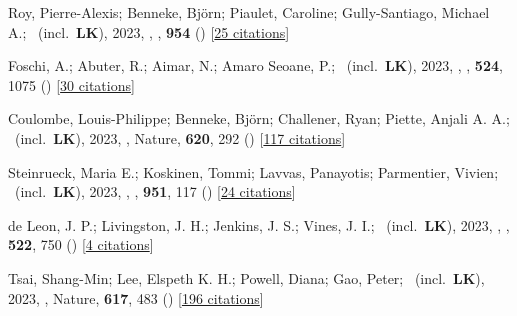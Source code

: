 \item[{\color{numcolor}\scriptsize93}] Roy, Pierre-Alexis; Benneke, Bj{\"o}rn; Piaulet, Caroline; Gully-Santiago, Michael A.; \etal\ (incl.\ \textbf{LK}), 2023, , \apj, \textbf{954} () [\href{https://ui.adsabs.harvard.edu/abs/2023ApJ...954L..52R}{25 citations}]

\item[{\color{numcolor}\scriptsize92}] Foschi, A.; Abuter, R.; Aimar, N.; Amaro Seoane, P.; \etal\ (incl.\ \textbf{LK}), 2023, , \mnras, \textbf{524}, 1075 () [\href{https://ui.adsabs.harvard.edu/abs/2023MNRAS.524.1075F}{30 citations}]

\item[{\color{numcolor}\scriptsize91}] Coulombe, Louis-Philippe; Benneke, Bj{\"o}rn; Challener, Ryan; Piette, Anjali A. A.; \etal\ (incl.\ \textbf{LK}), 2023, , Nature, \textbf{620}, 292 () [\href{https://ui.adsabs.harvard.edu/abs/2023Natur.620..292C}{117 citations}]

\item[{\color{numcolor}\scriptsize90}] Steinrueck, Maria E.; Koskinen, Tommi; Lavvas, Panayotis; Parmentier, Vivien; \etal\ (incl.\ \textbf{LK}), 2023, , \apj, \textbf{951}, 117 () [\href{https://ui.adsabs.harvard.edu/abs/2023ApJ...951..117S}{24 citations}]

\item[{\color{numcolor}\scriptsize89}] de Leon, J. P.; Livingston, J. H.; Jenkins, J. S.; Vines, J. I.; \etal\ (incl.\ \textbf{LK}), 2023, , \mnras, \textbf{522}, 750 () [\href{https://ui.adsabs.harvard.edu/abs/2023MNRAS.522..750D}{4 citations}]

\item[{\color{numcolor}\scriptsize88}] Tsai, Shang-Min; Lee, Elspeth K. H.; Powell, Diana; Gao, Peter; \etal\ (incl.\ \textbf{LK}), 2023, , Nature, \textbf{617}, 483 () [\href{https://ui.adsabs.harvard.edu/abs/2023Natur.617..483T}{196 citations}]

